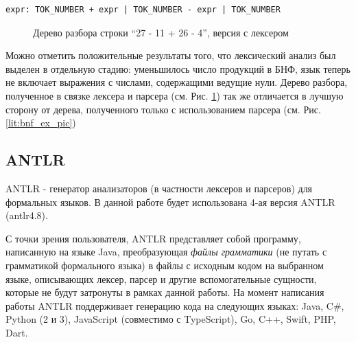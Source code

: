 \begin{code}
\label{lit:parser_bnf}
\begin{verbatim}
expr: TOK_NUMBER + expr | TOK_NUMBER - expr | TOK_NUMBER
\end{verbatim}
\end{code}

\begin{figure}[ht]
\begin{center}
\caption{
\label{lit:parser_bnf_pic} Дерево разбора строки \enquote{27 - 11 + 26 - 4}, версия с лексером
}
\end{center}
\end{figure}

Можно отметить положительные результаты того, что лексический анализ был выделен в отдельную стадию: уменьшилось число продукций в БНФ, язык теперь не включает выражения с числами, содержащими ведущие нули. Дерево разбора, полученное в связке лексера и парсера (см. Рис. \ref{lit:parser_bnf_pic}) так же отличается в лучшую сторону от дерева, полученного только с использованием парсера (см. Рис. \ref{lit:bnf_ex_pic})

\subsection{ANTLR}
ANTLR - генератор анализаторов (в частности лексеров и парсеров) для формальных языков. В данной работе будет использована 4-ая версия ANTLR (antlr4.8).

С точки зрения пользователя, ANTLR представляет собой программу, написанную на языке Java, преобразующая \textit{файлы грамматики} (не путать с грамматикой формального языка) в файлы с исходным кодом на выбранном языке, описывающих лексер, парсер и другие вспомогательные сущности, которые не будут затронуты в рамках данной работы. На момент написания работы ANTLR поддерживает генерацию кода на следующих языках: Java, C\#, Python (2 и 3), JavaScript (совместимо с TypeScript), Go, C++, Swift, PHP, Dart.

